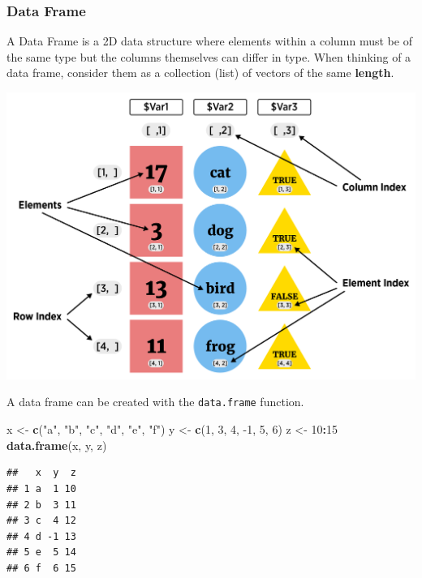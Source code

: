 \documentclass[
]{book}
\newenvironment{Shaded}{\begin{snugshade}}{\end{snugshade}}
\newcommand{\DecValTok}[1]{\textcolor[rgb]{0.00,0.00,0.81}{#1}}
\newcommand{\KeywordTok}[1]{\textcolor[rgb]{0.13,0.29,0.53}{\textbf{#1}}}
\newcommand{\NormalTok}[1]{#1}
\newcommand{\OperatorTok}[1]{\textcolor[rgb]{0.81,0.36,0.00}{\textbf{#1}}}
\newcommand{\StringTok}[1]{\textcolor[rgb]{0.31,0.60,0.02}{#1}}
\theoremstyle{definition}
\theoremstyle{definition}
\theoremstyle{definition}
\theoremstyle{remark}
\begin{document}
\hypertarget{data-frame-1}{%
\subsubsection{Data Frame}\label{data-frame-1}}

A Data Frame is a 2D data structure where elements within a column must be of the same type but the columns themselves can differ in type. When thinking of a data frame, consider them as a collection (list) of vectors of the same \textbf{length}.

\begin{center}\includegraphics[width=0.8\linewidth]{img/dfVisualF} \end{center}

A data frame can be created with the \texttt{data.frame} function.

\begin{Shaded}
\begin{Highlighting}[]
\NormalTok{x <-}\StringTok{ }\KeywordTok{c}\NormalTok{(}\StringTok{"a"}\NormalTok{, }\StringTok{"b"}\NormalTok{, }\StringTok{"c"}\NormalTok{, }\StringTok{"d"}\NormalTok{, }\StringTok{"e"}\NormalTok{, }\StringTok{"f"}\NormalTok{)}
\NormalTok{y <-}\StringTok{ }\KeywordTok{c}\NormalTok{(}\DecValTok{1}\NormalTok{, }\DecValTok{3}\NormalTok{, }\DecValTok{4}\NormalTok{, }\DecValTok{-1}\NormalTok{, }\DecValTok{5}\NormalTok{, }\DecValTok{6}\NormalTok{)}
\NormalTok{z <-}\StringTok{ }\DecValTok{10}\OperatorTok{:}\DecValTok{15}
\KeywordTok{data.frame}\NormalTok{(x, y, z)}
\end{Highlighting}
\end{Shaded}

\begin{verbatim}
##   x  y  z
## 1 a  1 10
## 2 b  3 11
## 3 c  4 12
## 4 d -1 13
## 5 e  5 14
## 6 f  6 15
\end{verbatim}
\end{document}
